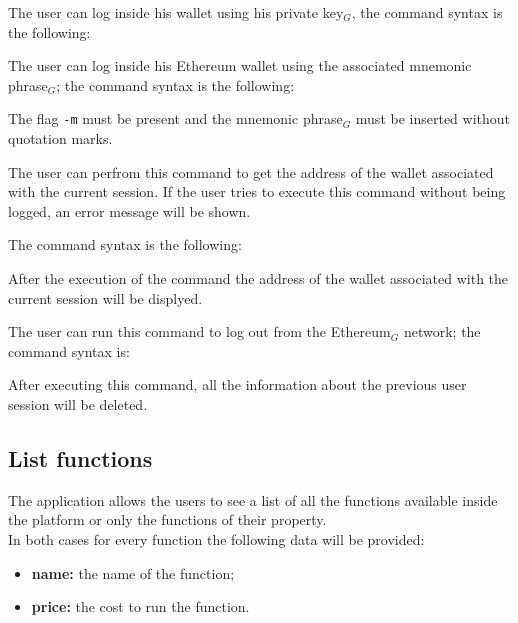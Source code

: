The user can log inside his wallet using his private key$_{G}$, the command syntax is the following: \\
\begin{center}
\end{center}

The user can log inside his Ethereum wallet using the associated mnemonic phrase$_{G}$; the command syntax is the following:

\begin{center}
\end{center}
The flag \texttt{-m} must be present and the mnemonic phrase$_{G}$ must be inserted without quotation marks.

The user can perfrom this command to get the address of the wallet associated with the current session. If the user tries to execute this command without being logged, an error message will be shown.

The command syntax is the following: \\
\begin{center}
\end{center}
After the execution of the command the address of the wallet associated with the current session will be displyed.

The user can run this command to log out from the Ethereum$_{G}$ network; the command syntax is:
\begin{center}
\end{center}
After executing this command, all the information about the previous user session will be deleted.

\subsection{List functions}
The application allows the users to see a list of all the functions available inside the platform or only the functions of their property. \\
\noindent In both cases for every function the following data will be provided:
\begin{itemize}
	\item \textbf{name: } the name of the function;
	\item \textbf{price: } the cost to run the function.
\end{itemize}

